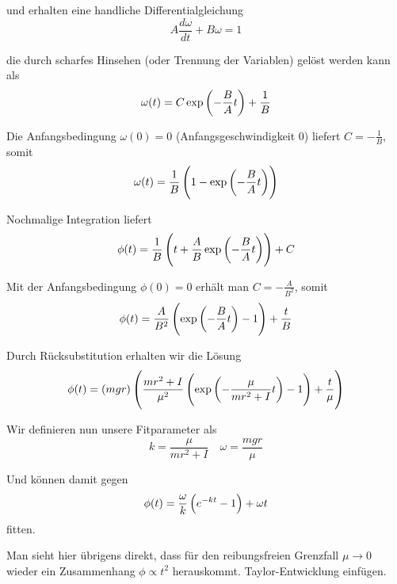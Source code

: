 \documentclass[a4paper,german,12pt,smallheadings]{scrartcl}
\begin{document}
und erhalten eine handliche Differentialgleichung
\begin{equation}
  A \frac{d \omega}{dt} + B \omega = 1
\end{equation}

die durch scharfes Hinsehen (oder Trennung der Variablen) gelöst werden kann als
\begin{equation}
  \omega(t) = C \exp\del{- \frac{B}{A} t} + \frac{1}{B}
\end{equation}

Die Anfangsbedingung $\omega(0) = 0$ (Anfangsgeschwindigkeit 0) liefert $C =
-\frac{1}{B}$, somit
\begin{equation}
  \omega(t) = \frac{1}{B} \del{1 - \exp\del{-\frac{B}{A} t}}
\end{equation}

Nochmalige Integration liefert
\begin{equation}
  \phi(t) = \frac{1}{B} \del{t + \frac{A}{B} \exp\del{-\frac{B}{A} t}} + C
\end{equation}

Mit der Anfangsbedingung $\phi(0) = 0$ erhält man $C = -\frac{A}{B^2}$, somit
\begin{equation}
  \phi(t) = \frac{A}{B^2} \del{ \exp\del{-\frac{B}{A} t} - 1} + \frac{t}{B}
\end{equation}

Durch Rücksubstitution erhalten wir die Lösung
\begin{equation}
  \phi(t)
  = \del{mgr}
  \del{
    \frac{mr^2+I}{\mu^2}
    \del{
      \exp\del{-\frac{\mu}{mr^2 + I} t} - 1
  } + \frac{t}{\mu}}
\end{equation}

Wir definieren nun unsere Fitparameter als
\begin{equation}
  k = \frac{\mu}{mr^2 + I} \quad
  \omega = \frac{mgr}{\mu}
\end{equation}

Und können damit gegen
\begin{equation}
  \phi(t) = \frac{\omega}{k} \del{e^{-kt} - 1} + \omega t
\end{equation}
fitten.

Man sieht hier übrigens direkt, dass für den reibungsfreien Grenzfall $\mu \to
0$ wieder ein Zusammenhang $\phi \propto t^2$ herauskommt. %
Taylor-Entwicklung einfügen.


\newpage
\begin{landscape}
  
\end{landscape}
\end{document}

